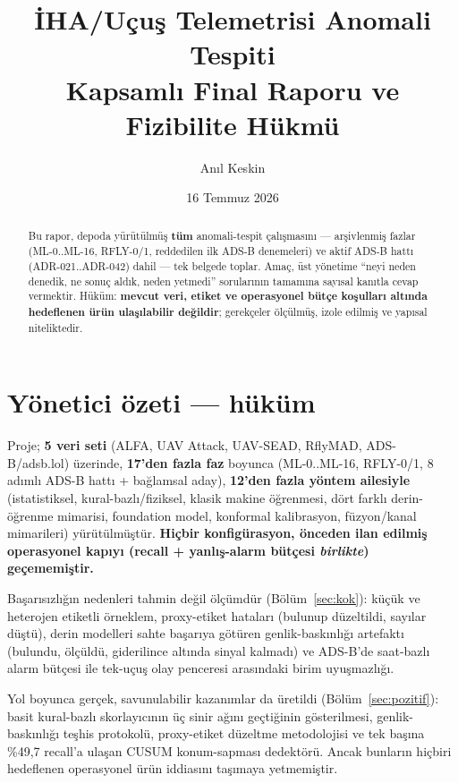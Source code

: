 \documentclass[11pt,a4paper]{article}
\title{\bfseries İHA/Uçuş Telemetrisi Anomali Tespiti\\[4pt]
\Large Kapsamlı Final Raporu ve Fizibilite Hükmü}
\author{Anıl Keskin}
\date{16 Temmuz 2026}
\begin{document}
\maketitle

\begin{abstract}
\noindent Bu rapor, depoda yürütülmüş \textbf{tüm} anomali-tespit çalışmasını
--- arşivlenmiş fazlar (ML-0..ML-16, RFLY-0/1, reddedilen ilk ADS-B denemeleri)
ve aktif ADS-B hattı (ADR-021..ADR-042) dahil --- tek belgede toplar. Amaç, üst
yönetime ``neyi neden denedik, ne sonuç aldık, neden yetmedi'' sorularının
tamamına sayısal kanıtla cevap vermektir. Hüküm: \textbf{mevcut veri, etiket ve
operasyonel bütçe koşulları altında hedeflenen ürün ulaşılabilir değildir};
gerekçeler ölçülmüş, izole edilmiş ve yapısal niteliktedir.
\end{abstract}

\tableofcontents
\newpage

\section{Yönetici özeti --- hüküm}

Proje; \textbf{5 veri seti} (ALFA, UAV Attack, UAV-SEAD, RflyMAD, ADS-B/adsb.lol)
üzerinde, \textbf{17'den fazla faz} boyunca (ML-0..ML-16, RFLY-0/1, 8 adımlı ADS-B
hattı + bağlamsal aday), \textbf{12'den fazla yöntem ailesiyle} (istatistiksel,
kural-bazlı/fiziksel, klasik makine öğrenmesi, dört farklı derin-öğrenme mimarisi,
foundation model, konformal kalibrasyon, füzyon/kanal mimarileri) yürütülmüştür.
\textbf{Hiçbir konfigürasyon, önceden ilan edilmiş operasyonel kapıyı (recall +
yanlış-alarm bütçesi \emph{birlikte}) geçememiştir.}

Başarısızlığın nedenleri tahmin değil ölçümdür (Bölüm~\ref{sec:kok}): küçük ve
heterojen etiketli örneklem, proxy-etiket hataları (bulunup düzeltildi, sayılar
düştü), derin modelleri sahte başarıya götüren genlik-baskınlığı artefaktı
(bulundu, ölçüldü, giderilince altında sinyal kalmadı) ve ADS-B'de saat-bazlı
alarm bütçesi ile tek-uçuş olay penceresi arasındaki birim uyuşmazlığı.

Yol boyunca gerçek, savunulabilir kazanımlar da üretildi (Bölüm~\ref{sec:pozitif}):
basit kural-bazlı skorlayıcının üç sinir ağını geçtiğinin gösterilmesi,
genlik-baskınlığı teşhis protokolü, proxy-etiket düzeltme metodolojisi ve tek
başına \%49{,}7 recall'a ulaşan CUSUM konum-sapması dedektörü. Ancak bunların
hiçbiri hedeflenen operasyonel ürün iddiasını taşımaya yetmemiştir.
\end{document}
